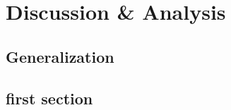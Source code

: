 \chapter{Discussion \& Analysis} \label{ch:discussion}

\section{Generalization}
\section{first section}

